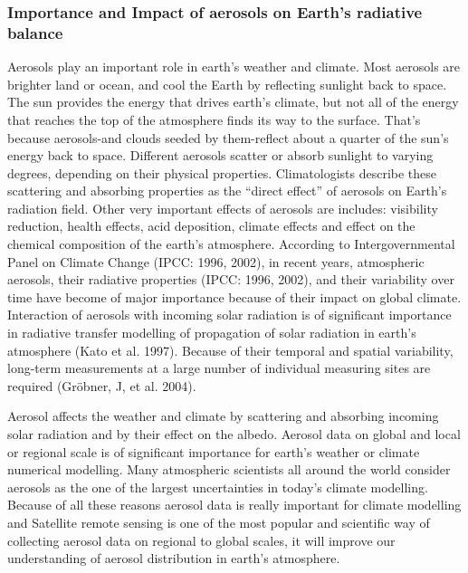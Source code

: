 \documentclass{scrartcl}
\begin{document}
\subsubsection{Importance and Impact of aerosols on Earth's radiative balance}
Aerosols play an important role in earth’s weather and climate. Most aerosols are brighter land or ocean, and cool the Earth by reflecting sunlight back to space. The sun provides the energy that drives earth’s climate, but not all of the energy that reaches the top of the atmosphere finds its way to the surface. That’s because aerosols-and clouds seeded by them-reflect about a quarter of the sun’s energy back to space. Different aerosols scatter or absorb sunlight to varying degrees, depending on their physical properties. Climatologists describe these scattering and absorbing properties as the “direct effect” of aerosols on Earth’s radiation field. Other very important effects of aerosols are includes: visibility reduction, health effects, acid deposition, climate effects and effect on the chemical composition of the earth’s atmosphere. According to Intergovernmental Panel on Climate Change (IPCC: 1996, 2002), in recent years, atmospheric aerosols, their radiative properties (IPCC: 1996, 2002), and their variability over time have become of major importance because of their impact on global climate. Interaction of aerosols with incoming solar radiation is of significant importance in radiative transfer modelling of propagation of solar radiation in earth’s atmosphere (Kato et al. 1997). Because of their temporal and spatial variability, long-term measurements at a large number of individual measuring sites are required (Gröbner, J, et al. 2004).

Aerosol affects the weather and climate by scattering and absorbing incoming solar radiation and by their effect on the albedo. Aerosol data on global and local or regional scale is of significant importance for earth’s weather or climate numerical modelling. Many atmospheric scientists all around the world consider aerosols as the one of the largest uncertainties in today’s climate modelling. Because of all these reasons aerosol data is really important for climate modelling and Satellite remote sensing is one of the most popular and scientific way of collecting aerosol data on regional to global scales, it will improve our understanding of aerosol distribution in earth’s atmosphere. 
\end{document}
